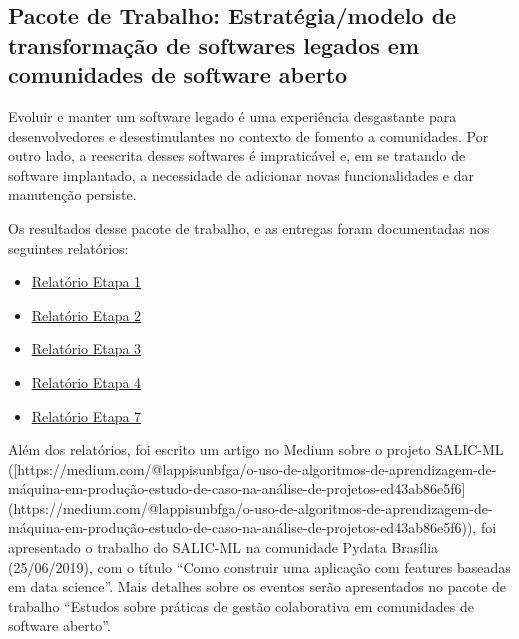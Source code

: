\hypertarget{pacote-de-trabalho-estratuxe9giamodelo-de-transformauxe7uxe3o-de-softwares-legados-em-comunidades-de-software-aberto}{%
\subsection{Pacote de Trabalho: Estratégia/modelo de transformação de
softwares legados em comunidades de software
aberto}\label{pacote-de-trabalho-estratuxe9giamodelo-de-transformauxe7uxe3o-de-softwares-legados-em-comunidades-de-software-aberto}}

Evoluir e manter um software legado é uma experiência desgastante para
desenvolvedores e desestimulantes no contexto de fomento a comunidades.
Por outro lado, a reescrita desses softwares é impraticável e, em se
tratando de software implantado, a necessidade de adicionar novas
funcionalidades e dar manutenção persiste.

Os resultados desse pacote de trabalho, e as entregas foram documentadas
nos seguintes relatórios:

\begin{itemize}
\item
  \href{https://github.com/lappis-unb/EcossistemasSWLivre/blob/master/Relatorios/R1/RELATÓRIO\%20ETAPA\%201.pdf}{Relatório
  Etapa 1}
\item
  \href{https://github.com/lappis-unb/EcossistemasSWLivre/blob/master/Relatorios/R2/RELATÓRIO\%20ETAPA\%202.pdf}{Relatório
  Etapa 2}
\item
  \href{https://github.com/lappis-unb/EcossistemasSWLivre/blob/master/Relatorios/R3/RELATÓRIO\%20ETAPA\%203.md}{Relatório
  Etapa 3}
\item
  \href{https://github.com/lappis-unb/EcossistemasSWLivre/blob/master/Relatorios/R4/RELATÓRIO\%20ETAPA\%204.pdf}{Relatório
  Etapa 4}
\item
  \href{https://github.com/lappis-unb/EcossistemasSWLivre/blob/master/Relatorios/R7/RELATÓRIO\%20ETAPA\%207.pdf}{Relatório
  Etapa 7}
\end{itemize}

Além dos relatórios, foi escrito um artigo no Medium sobre o projeto
SALIC-ML
({[}https://medium.com/@lappisunbfga/o-uso-de-algoritmos-de-aprendizagem-de-máquina-em-produção-estudo-de-caso-na-análise-de-projetos-ed43ab86e5f6{]}(https://medium.com/@lappisunbfga/o-uso-de-algoritmos-de-aprendizagem-de-máquina-em-produção-estudo-de-caso-na-análise-de-projetos-ed43ab86e5f6)),
foi apresentado o trabalho do SALIC-ML na comunidade Pydata Brasília
(25/06/2019), com o título ``Como construir uma aplicação com features
baseadas em data science''. Mais detalhes sobre os eventos serão
apresentados no pacote de trabalho ``Estudos sobre práticas de gestão
colaborativa em comunidades de software aberto''.

